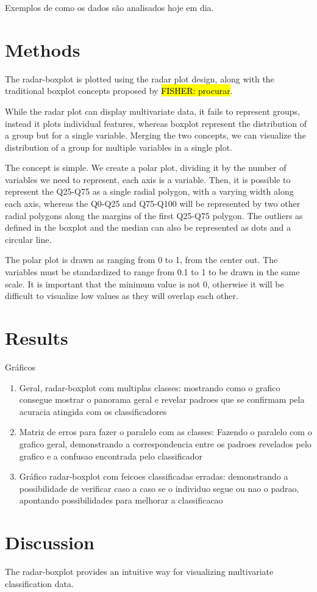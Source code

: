 \documentclass[12pt]{article}
\begin{document}
Exemplos de como os dados são analisados hoje em dia.


\section{Methods}
\label{sec:meth}
The radar-boxplot is plotted using the radar plot design, along with the traditional boxplot concepts proposed by \hl{FISHER: procurar}. 

While the radar plot can display multivariate data, it fails to represent groups, instead it plots individual features, whereas boxplot represent the distribution of a group but for a single variable. Merging the two concepts, we can visualize the distribution of a group for multiple variables in a single plot. 

The concept is simple. We create a polar plot, dividing it by the number of variables we need to represent, each axis is a variable. Then, it is possible to represent the Q25-Q75 as a single radial polygon, with a varying width along each axis, whereas the Q0-Q25 and Q75-Q100 will be represented by two other radial polygons along the margins of the first Q25-Q75 polygon. The outliers as defined in the boxplot and the median can also be represented as dots and a circular line.

The polar plot is drawn as ranging from 0 to 1, from the center out. The variables must be standardized to range from 0.1 to 1 to be drawn in the same scale. It is important that the minimum value is not 0, otherwise it will be difficult to visualize low values as they will overlap each other.

\section{Results}
\label{sec:results}
Gráficos
\begin{enumerate}
  \item Geral, radar-boxplot com multiplas classes: mostrando como o grafico consegue mostrar o panorama geral e revelar padroes que se confirmam pela acuracia atingida com os classificadores
  \item Matriz de erros para fazer o paralelo com as classes: Fazendo o paralelo com o grafico geral, demonstrando a correspondencia entre os padroes revelados pelo grafico e a confusao encontrada pelo classificador
  \item Gráfico radar-boxplot com feicoes classificadas erradas: demonstrando a possibilidade de verificar caso a caso se o individuo segue ou nao o padrao, apontando possibilidades para melhorar a classificacao
\end{enumerate}


\section{Discussion}
\label{sec:conc}
\bigskip
The radar-boxplot provides an intuitive way for visualizing multivariate classification data. 




\end{document}
